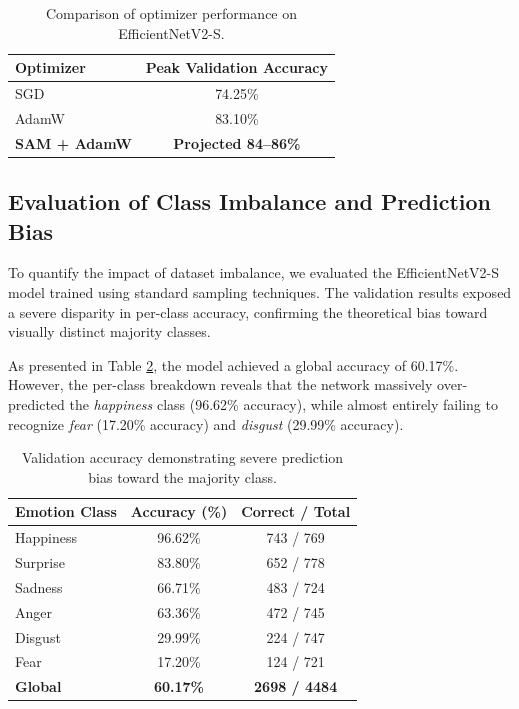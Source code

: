 \begin{table}[ht]
\centering
\begin{tabular}{lc}
\toprule
Optimizer & Peak Validation Accuracy \\
\midrule
SGD & 74.25\% \\
AdamW & 83.10\% \\
\textbf{SAM + AdamW} & \textbf{Projected 84--86\%} \\
\bottomrule
\end{tabular}
\caption{Comparison of optimizer performance on EfficientNetV2-S.}
\label{tab:optimizers}
\end{table}

\subsection{Evaluation of Class Imbalance and Prediction Bias}
To quantify the impact of dataset imbalance, we evaluated the EfficientNetV2-S model trained using standard sampling techniques. The validation results exposed a severe disparity in per-class accuracy, confirming the theoretical bias toward visually distinct majority classes.

As presented in Table \ref{tab:bias_evaluation}, the model achieved a global accuracy of 60.17\%. However, the per-class breakdown reveals that the network massively over-predicted the \textit{happiness} class (96.62\% accuracy), while almost entirely failing to recognize \textit{fear} (17.20\% accuracy) and \textit{disgust} (29.99\% accuracy).

\begin{table}[ht]
\centering
\begin{tabular}{lcc}
\toprule
\textbf{Emotion Class} & \textbf{Accuracy (\%)} & \textbf{Correct / Total} \\
\midrule
Happiness & 96.62\% & 743 / 769 \\
Surprise & 83.80\% & 652 / 778 \\
Sadness & 66.71\% & 483 / 724 \\
Anger & 63.36\% & 472 / 745 \\
Disgust & 29.99\% & 224 / 747 \\
Fear & 17.20\% & 124 / 721 \\
\midrule
\textbf{Global} & \textbf{60.17\%} & \textbf{2698 / 4484} \\
\bottomrule
\end{tabular}
\caption{Validation accuracy demonstrating severe prediction bias toward the majority class.}
\label{tab:bias_evaluation}
\end{table}

